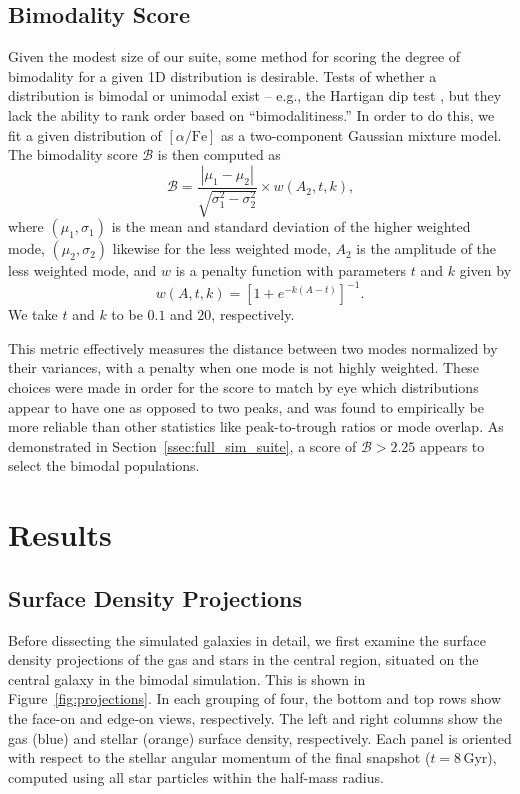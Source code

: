 \documentclass[twocolumn,linenumbers,trackchanges]{aastex631}
\newcommand{\Gyr}{\ensuremath{\textrm{Gyr}}}
\newcommand{\alphaFe}{\ensuremath{[\alpha/\textrm{Fe}]}}
\begin{document}
\subsection{Bimodality Score}\label{ssec:bim_score}
Given the modest size of our suite, some method for scoring the degree of bimodality for a given 1D distribution is desirable. Tests of whether a distribution is bimodal or unimodal exist -- e.g., the Hartigan dip test \citep{10.1214/aos/1176346577}, but they lack the ability to rank order based on ``bimodalitiness.'' In order to do this, we fit a given distribution of \alphaFe{} as a two-component Gaussian mixture model. The bimodality score $\mathcal{B}$ is then computed as
\begin{equation}\label{eq:bimscore}
\mathcal{B} = \frac{\left|\mu_1-\mu_2\right|}{\sqrt{\sigma_1^2-\sigma_2^2}}\times w(A_2, t, k)\textrm{,}
\end{equation}
where $(\mu_1, \sigma_1)$ is the mean and standard deviation of the higher weighted mode, $(\mu_2, \sigma_2)$ likewise for the less weighted mode, $A_2$ is the amplitude of the less weighted mode, and $w$ is a penalty function with parameters $t$ and $k$ given by
\begin{equation}\label{eq:bimscore_penalty}
w(A, t, k) = \left[1+e^{-k\left(A-t\right)}\right]^{-1}\text{.}
\end{equation}
We take $t$ and $k$ to be $0.1$ and $20$, respectively.

This metric effectively measures the distance between two modes normalized by their variances, with a penalty when one mode is not highly weighted. These choices were made in order for the score to match by eye which distributions appear to have one as opposed to two peaks, and was found to empirically be more reliable than other statistics like peak-to-trough ratios or mode overlap. As demonstrated in Section~\ref{ssec:full_sim_suite}, a score of $\mathcal{B}>2.25$ appears to select the bimodal populations.

\section{Results}\label{sec:results}
\subsection{Surface Density Projections}\label{ssec:projections}
Before dissecting the simulated galaxies in detail, we first examine the surface density projections of the gas and stars in the central region, situated on the central galaxy in the bimodal simulation. This is shown in Figure~\ref{fig:projections}. In each grouping of four, the bottom and top rows show the face-on and edge-on views, respectively. The left and right columns show the gas (blue) and stellar (orange) surface density, respectively. Each panel is oriented with respect to the stellar angular momentum of the final snapshot ($t=8\,\Gyr$), computed using all star particles within the half-mass radius.
\end{document}
